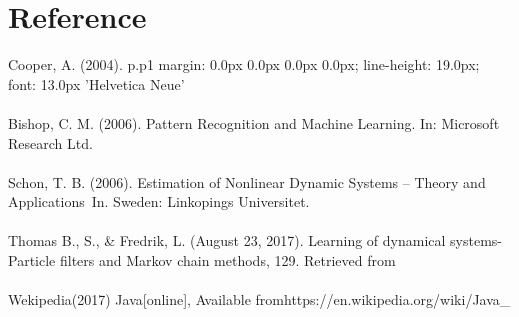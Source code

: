 \documentclass[11pt,oneside,a4paper]{article}
\begin{document}
\newpage
\section{Reference}
Cooper, A. (2004). p.p1 {margin: 0.0px 0.0px 0.0px 0.0px; line-height: 19.0px; font: 13.0px 'Helvetica Neue'}
\\\\Bishop, C. M. (2006). Pattern Recognition and Machine Learning. In: Microsoft Research Ltd.
\\\\Schon, T. B. (2006). Estimation of Nonlinear Dynamic Systems – Theory and Applications In. Sweden: Linkopings Universitet.
\\\\Thomas B., S., & Fredrik, L. (August 23, 2017). Learning of dynamical systems-Particle filters and Markov chain methods, 129. Retrieved from
\\\\Wekipedia(2017) Java[online], Available from\langle https://en.wikipedia.org/wiki/Java_%
\end{document}
